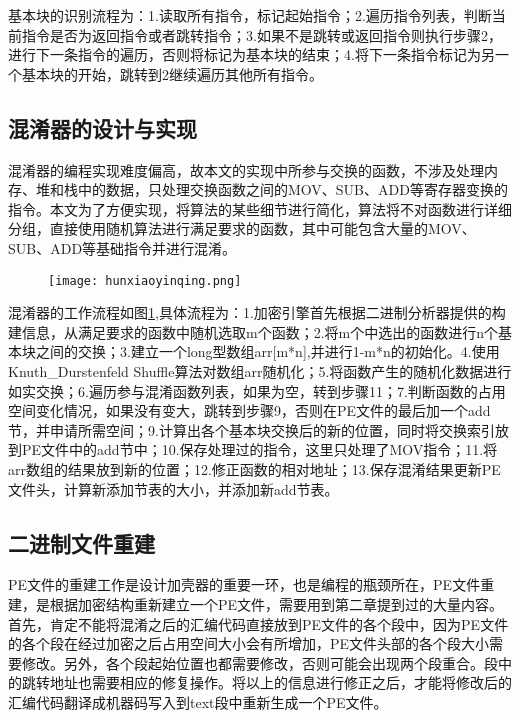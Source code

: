 基本块的识别流程为：1.读取所有指令，标记起始指令；2.遍历指令列表，判断当前指令是否为返回指令或者跳转指令；3.如果不是跳转或返回指令则执行步骤2，进行下一条指令的遍历，否则将标记为基本块的结束；4.将下一条指令标记为另一个基本块的开始，跳转到2继续遍历其他所有指令。


\subsection{混淆器的设计与实现}


混淆器的编程实现难度偏高，故本文的实现中所参与交换的函数，不涉及处理内存、堆和栈中的数据，只处理交换函数之间的MOV、SUB、ADD等寄存器变换的指令。本文为了方便实现，将算法的某些细节进行简化，算法将不对函数进行详细分组，直接使用随机算法进行满足要求的函数，其中可能包含大量的MOV、SUB、ADD等基础指令并进行混淆。

\begin{figure}[htbp]
	\centering
	\texttt{[image: hunxiaoyinqing.png]}
	\label{hunxiaoyinqing}
\end{figure}

混淆器的工作流程如图\ref{hunxiaoyinqing},具体流程为：1.加密引擎首先根据二进制分析器提供的构建信息，从满足要求的函数中随机选取m个函数；2.将m个中选出的函数进行n个基本块之间的交换；3.建立一个long型数组arr[m*n],并进行1-m*n的初始化。4.使用Knuth\_Durstenfeld Shuffle算法对数组arr随机化；5.将函数产生的随机化数据进行如实交换；6.遍历参与混淆函数列表，如果为空，转到步骤11；7.判断函数的占用空间变化情况，如果没有变大，跳转到步骤9，否则在PE文件的最后加一个add节，并申请所需空间；9.计算出各个基本块交换后的新的位置，同时将交换索引放到PE文件中的add节中；10.保存处理过的指令，这里只处理了MOV指令；11.将arr数组的结果放到新的位置；12.修正函数的相对地址；13.保存混淆结果更新PE文件头，计算新添加节表的大小，并添加新add节表。

\subsection{二进制文件重建}

PE文件的重建工作是设计加壳器的重要一环，也是编程的瓶颈所在，PE文件重建，是根据加密结构重新建立一个PE文件，需要用到第二章提到过的大量内容。首先，肯定不能将混淆之后的汇编代码直接放到PE文件的各个段中，因为PE文件的各个段在经过加密之后占用空间大小会有所增加，PE文件头部的各个段大小需要修改。另外，各个段起始位置也都需要修改，否则可能会出现两个段重合。段中的跳转地址也需要相应的修复操作。将以上的信息进行修正之后，才能将修改后的汇编代码翻译成机器码写入到text段中重新生成一个PE文件。

